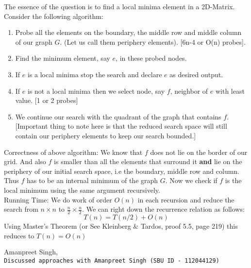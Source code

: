 \documentclass[11pt]{article}
\begin{document}
The essence of the question is to find a local minima element in a 2D-Matrix. \\

Consider the following algorithm:
\begin{enumerate}
\item  Probe all the elements on the boundary, the middle row and middle column of our graph $ G $. (Let us call them periphery elements). [6n-4  or O(n) probes].
\item  Find the minimum element, say $ e $, in these probed nodes.
\item  If $ e $ is a local minima stop the search and declare $ e $ as desired output.
\item  If $ e $ is not a local minima then we select node, say $ f $, neighbor of $ e $ with least value. [1 or 2 probes]
\item  We continue our search with the quadrant of the graph that contains $ f $. [Important thing to note here is that the reduced search space will still contain our periphery elements to keep our search bounded.]
\end{enumerate}

Correctness of above algorithm:
We know that $ f $ does not lie on the border of our grid. And also $ f $ is smaller than all the elements that surround it \textbf{and} lie on the periphery of our initial search space, i.e the boundary, middle row and column. Thus $ f $ has to be an internal minimum of the graph $ G $. Now we check if $ f $ is the local minimum using the same argument recursively. \\

Running Time:
We do work of order $ O(n) $ in each recursion and reduce the search from $ n \times n $ to $ \frac{n}{2} \times \frac{n}{2} $. We can right down the recurrence relation as follows:
\begin{equation*}
T(n) = T(n/2) + O(n)
\end{equation*}
Using Master's Theorem (or See Kleinberg \& Tardos, proof 5.5, page 219) this reduces to $ T(n) = O(n) $

\clearpage

\begin{thebibliography}{9}
	Amanpreet Singh,
	\\\texttt{Discussed approaches with Amanpreet Singh (SBU ID - 112044129)}
	
\end{thebibliography}
\end{document}
